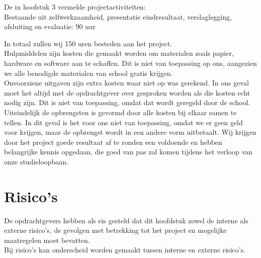 \documentclass[oneside]{book}
\begin{document}
De in hoofstuk 3 vermelde projectactiviteiten:\\ 
Bestaande uit zelfwerkzaamheid, presentatie eindresultaat, verslaglegging, afsluiting en evaluatie: 90 uur

In totaal zullen wij 150 uren besteden aan het project.\\

Hulpmiddelen zijn kosten die gemaakt worden om materialen zoals papier, 
hardware en software aan te schaffen. Dit is niet van toepassing op ons, aangezien
we alle benodigde materialen van school gratis krijgen.\\

Onvoorziene uitgaven zijn extra kosten waar niet op was gerekend. In ons geval
moet het altijd met de opdrachtgever over gesproken worden als die kosten echt
nodig zijn. Dit is niet van toepassing, omdat dat wordt geregeld door de school.\\

Uiteindelijk de opbrengsten is gevormd door alle kosten bij elkaar
samen te tellen. In dit geval is het voor ons niet van toepassing, omdat
we er geen geld voor krijgen, maar de opbrengst wordt in een andere vorm uitbetaalt. 
Wij krijgen door het project goede resultaat af te ronden een voldoende en hebben belangrijke    
kennis   opgedaan, die goed van pas zal komen tijdens het verloop van onze studieloopbaan.
\clearpage
\chapter{Risico's}
De opdrachtgevers hebben als eis gesteld dat dit hoofdstuk zowel de interne als externe risico’s, de gevolgen met betrekking tot het project en mogelijke maatregelen moet bevatten.\\

Bij risico's kan onderscheid worden gemaakt tussen interne en externe risico's.
\end{document}
